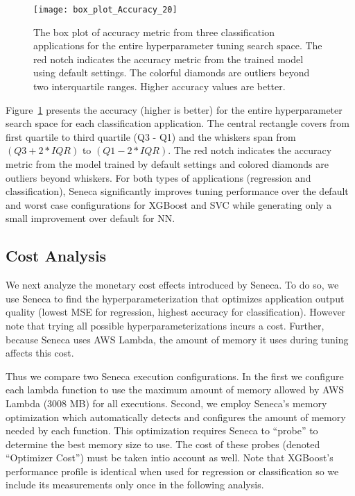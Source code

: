 \begin{figure}[t] \centering 
\texttt{[image: box\_plot\_Accuracy\_20]}
\vspace{-0.4in}
\caption{The box plot of accuracy metric from three classification applications for the entire hyperparameter tuning search space. The red notch indicates the accuracy metric from the trained model using default settings. The colorful diamonds are outliers beyond two interquartile ranges. Higher accuracy values are better.
\label{fig:box_plot_accuracy}}
\vspace{-0.1in}
\end{figure}

Figure~\ref{fig:box_plot_accuracy} presents the accuracy (higher is better) 
for the entire hyperparameter search space for each classification
application.  The central rectangle covers from first quartile to third quartile (Q3 - Q1) and the whiskers span from \texttt{$(Q3 + 2 * IQR)$} to \texttt{$(Q1 - 2 * IQR)$}. The red notch indicates the accuracy metric from the model trained by default settings and colored diamonds are outliers beyond whiskers.
For both types of applications (regression and classification), Seneca significantly
improves tuning performance over the default and worst case configurations for 
XGBoost and SVC while generating only a small improvement over default for NN.


\subsection{Cost Analysis}

We next analyze the monetary cost effects introduced by Seneca.  To do so, we
use Seneca to find the hyperparameterization that optimizes application output
quality (lowest MSE for regression, highest accuracy for classification).
However note that trying all possible hyperparameterizations incurs a cost.
Further, because Seneca uses AWS Lambda, the amount of memory it uses during
tuning affects this cost. 


Thus we compare two Seneca execution configurations.  In the first
we configure each lambda function to
use the maximum amount of memory allowed by AWS Lambda (3008 MB) for all
executions.
Second, we
employ Seneca's memory optimization which automatically detects and configures
the amount of memory needed by each function.  This optimization requires
Seneca to ``probe'' to determine the best memory size to use.  The
cost of these probes
(denoted ``Optimizer Cost'') must be taken intio account as well.
Note that XGBoost's performance profile is identical when used for regression
or classification so we include its measurements only once in the following
analysis.


